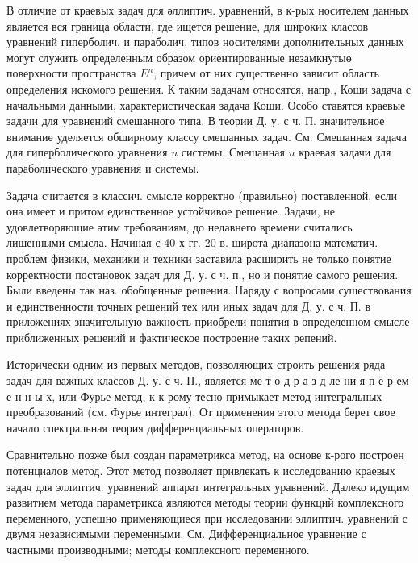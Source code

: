\documentclass[10pt]{article}
\begin{document}
В отличие от краевых задач для әллиптич. уравнений, в к-рых носителем данных является вся граница области, где ищется решение, для широких классов уравнений гиперболич. и параболич. типов носителями дополнительных данных могут служить определенным образом ориентированные незамкнутыө поверхности пространства $E^{n}$, причем от них существенно зависит область определения искомого решения. К таким задачам относятся, напр., Коши задача с начальными данными, характеристическая задача Коши. Особо ставятся краевые задачи для уравнений смешанного типа. В теории Д. у. с ч. П. значительное внимание уделяется обширному классу смешанных задач. См. Смешанная задача для гиперболического уравнения $u$ системы, Смешанная $u$ краевая задачи для параболического уравнения и системы.



Задача считается в классич. смысле корректно (правильно) поставленной, если она имеет и притом единственное устойчивое решение. Задачи, не удовлетворяющие әтим требованиям, до недавнего времени считались лишенными смысла. Начиная с 40-х гг. 20 в. широта диапазона математич. проблем физики, механики и техники заставила расширить не только понятие корректности постановок задач для Д. у. с ч. п., но и понятие самого решения. Были введены так наз. обобщенные решения. Наряду с вопросами существования и единственности точных решений тех или иных задач для Д. у. с ч. П. в приложениях значительную важность приобрели понятия в определенном смысле приближенных решений и фактическое построение таких репений.



Исторически одним из первых методов, позволяющих строить решения ряда задач для важных классов Д. у. с ч. П., является ме т о д р а з д ле ни я п е р ем е н н ы х, или Фурье метод, к к-рому тесно примыкает метод интегральных преобразований (см. Фурье интеграл). От применения этого метода берет свое начало спектральная теория дифференциальных операторов.



Сравнительно позже был создан параметрикса метод, на основе к-рого построен потенциалов метод. Этот метод позволяет привлекать к исследованию краевых задач для эллиптич. уравнений аппарат интегральных уравнений. Далеко идущим развитием метода параметрикса являются методы теории функций комплексного переменного, успешно применяющиеся при исследовании эллиптич. уравнений с двумя независимыми переменными. См. Дифференциальное уравнение с частными производными; методы комплексного переменного.
\end{document}
